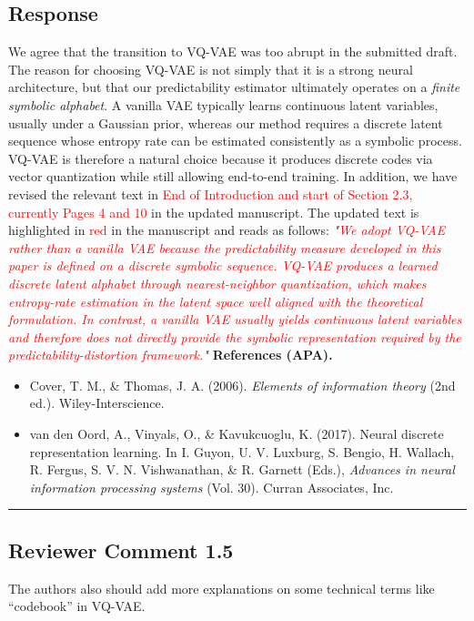 \documentclass{NSF}
\begin{document}
\subsection{Response}
We agree that the transition to VQ-VAE was too abrupt in the submitted draft. The reason for choosing VQ-VAE is not simply that it is a strong neural architecture, but that our predictability estimator ultimately operates on a \emph{finite symbolic alphabet}. A vanilla VAE typically learns continuous latent variables, usually under a Gaussian prior, whereas our method requires a discrete latent sequence whose entropy rate can be estimated consistently as a symbolic process. VQ-VAE is therefore a natural choice because it produces discrete codes via vector quantization while still allowing end-to-end training.
\noindent In addition, we have revised the relevant text in \textcolor{red}{End of Introduction and start of Section 2.3, currently Pages 4 and 10} in the updated manuscript. The updated text is highlighted in \textcolor{red}{red} in the manuscript and reads as follows:
\vskip 0.1cm
\noindent \textit{"\textcolor{red}{We adopt VQ-VAE rather than a vanilla VAE because the predictability measure developed in this paper is defined on a discrete symbolic sequence. VQ-VAE produces a learned discrete latent alphabet through nearest-neighbor quantization, which makes entropy-rate estimation in the latent space well aligned with the theoretical formulation. In contrast, a vanilla VAE usually yields continuous latent variables and therefore does not directly provide the symbolic representation required by the predictability-distortion framework.}"}
\vskip 0.05in
\noindent\textbf{References (APA).}
\begin{itemize}
    \item Cover, T. M., \& Thomas, J. A. (2006). \textit{Elements of information theory} (2nd ed.). Wiley-Interscience.
    \item van den Oord, A., Vinyals, O., \& Kavukcuoglu, K. (2017). Neural discrete representation learning. In I. Guyon, U. V. Luxburg, S. Bengio, H. Wallach, R. Fergus, S. V. N. Vishwanathan, \& R. Garnett (Eds.), \textit{Advances in neural information processing systems} (Vol. 30). Curran Associates, Inc.
\end{itemize}

\noindent\rule{16.5cm}{1.0pt}

\subsection{Reviewer Comment 1.5}
\begin{mdframed}
The authors also should add more explanations on some technical terms like ``codebook'' in VQ-VAE.
\end{mdframed}
\end{document}
